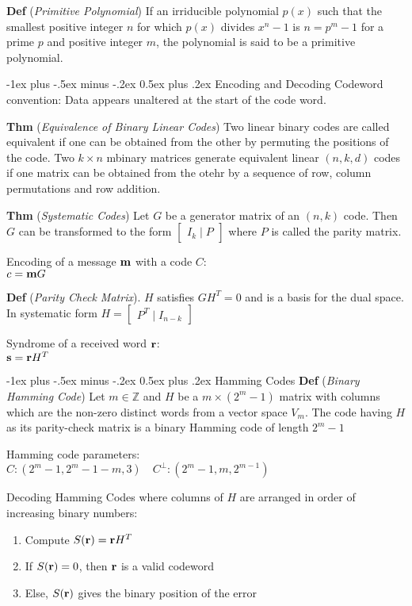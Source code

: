 \documentclass[12pt,landscape]{article}
\makeatletter
\renewcommand{\section}{\@startsection{section}{1}{0mm}%
                                {-1ex plus -.5ex minus -.2ex}%
                                {0.5ex plus .2ex}%
                                {\normalfont\normalsize\bfseries}}
\newcommand{\tab}{\hspace{.02\textwidth}}
\newcommand{\defn}[1]{\textbf{Def} (\emph{#1})}
\newcommand{\thm}[1]{\textbf{Thm} (\emph{#1})}
\makeatother
\begin{document}
\begin{multicols*}{3}
\defn{Primitive Polynomial} If an irriducible polynomial $p(x)$ such that the smallest positive integer $n$ for which $p(x)$ divides $x^n - 1$ is $n=p^m - 1$ for a prime $p$ and positive integer $m$, the polynomial is said to be a primitive polynomial.

\section{Encoding and Decoding}
Codeword convention: Data appears unaltered at the start of the code word.

\thm{Equivalence of Binary Linear Codes} Two linear binary codes are called equivalent if one can be obtained from the other by permuting the positions of the code. Two $k\times n$ mbinary matrices generate equivalent linear $(n,k,d)$ codes if one matrix can be obtained from the otehr by a sequence of row, column permutations and row addition.

\thm{Systematic Codes} Let $G$ be a generator matrix of an $(n,k)$ code. Then $G$ can be transformed to the form $\begin{bmatrix}
	I_k \mid P
\end{bmatrix}$ where $P$ is called the parity matrix.

Encoding of a message $\vb{m}$ with a code $C$:\\
\tab $c = \vb{m}G$

\defn{Parity Check Matrix}. $H$ satisfies $GH^T = 0$ and is a basis for the dual space. In systematic form $H = \begin{bmatrix}
	P^T \mid I_{n-k}
\end{bmatrix}$

Syndrome of a received word $\vb{r}$:\\
\tab $\vb{s} = \vb{r}H^T$

\section{Hamming Codes}
\defn{Binary Hamming Code} Let $m \in \mathbb{Z}$ and $H$ be a $m \times (2^m-1)$ matrix with columns which are the non-zero distinct words from a vector space $V_m$. The code having $H$ as its parity-check matrix is a binary Hamming code of length $2^m-1$

Hamming code parameters:\\
\tab $C: (2^m-1, 2^m-1-m, 3) \quad C^\perp: (2^m-1, m, 2^{m-1})$

Decoding Hamming Codes where columns of $H$ are arranged in order of increasing binary numbers:
\begin{enumerate}[itemsep=0em]
	\item Compute $S(\vb{r}) = \vb{r}H^T$
	\item If $S(\vb{r}) = 0$, then $\vb{r}$ is a valid codeword
	\item Else, $S(\vb{r})$ gives the binary position of the error 
\end{enumerate}


\end{multicols*}
\end{document}
